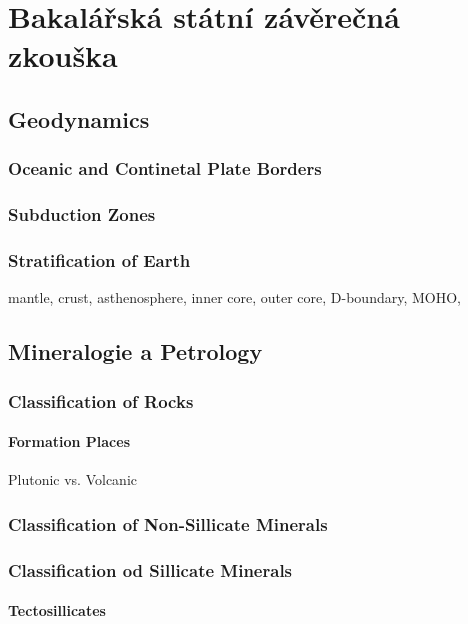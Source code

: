 
\part{Bakalářská státní závěrečná zkouška}

\chapter{Geodynamics}

\section{Oceanic and Continetal Plate Borders}

\section{Subduction Zones}

\section{Stratification of Earth}

mantle, crust, asthenosphere, inner core, outer core, D-boundary, MOHO, 

\chapter{Mineralogie a Petrology}

\section{Classification of Rocks}

\subsection{Formation Places}

Plutonic vs. Volcanic

\section{Classification of Non-Sillicate Minerals}


\section{Classification od Sillicate Minerals}

\subsection{Tectosillicates}

